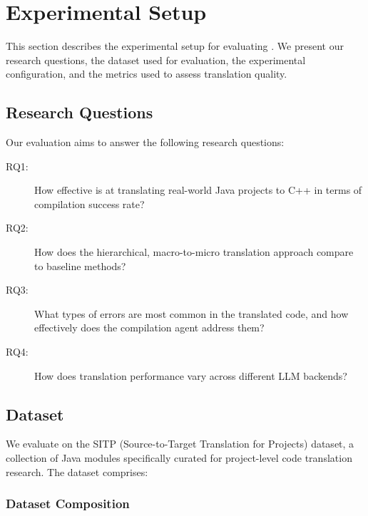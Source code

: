 
\section{Experimental Setup}

This section describes the experimental setup for evaluating \tool{}. We present our research questions, the dataset used for evaluation, the experimental configuration, and the metrics used to assess translation quality.

\subsection{Research Questions}

Our evaluation aims to answer the following research questions:

\begin{description}
\item[RQ1:] How effective is \tool{} at translating real-world Java projects to C++ in terms of compilation success rate?

\item[RQ2:] How does the hierarchical, macro-to-micro translation approach compare to baseline methods?

\item[RQ3:] What types of errors are most common in the translated code, and how effectively does the compilation agent address them?

\item[RQ4:] How does translation performance vary across different LLM backends?
\end{description}

\subsection{Dataset}

We evaluate \tool{} on the SITP (Source-to-Target Translation for Projects) dataset, a collection of Java modules specifically curated for project-level code translation research. The dataset comprises:

\subsubsection{Dataset Composition}

